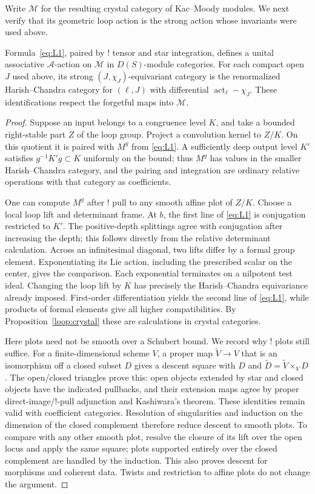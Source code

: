 Write $\mathcal M$ for the resulting crystal category of Kac--Moody
modules.  We next verify that its geometric loop action is the strong
action whose invariants were used above.

\begin{proposition}\label{loop:strong-action}
Formula~\eqref{eq:L1}, paired by ! tensor and star integration, defines
a unital associative $\mathcal A$-action on $\mathcal M$ in
$D(S)$-module categories.  For each compact open $J$ used above, its
strong $(J,\chi_J)$-equivariant category is the renormalized
Harish--Chandra category for $(\ell,J)$ with differential
$\operatorname{act}_\ell-\chi_J$.  These identifications respect
the forgetful maps into $\mathcal M$.
\end{proposition}

\begin{proof}
Suppose an input belongs to a congruence level $K$, and take a bounded
right-stable part $Z$ of the loop group.  Project a convolution kernel
to $Z/K$.  On this quotient it is paired with $M^g$ from
\eqref{eq:L1}.  A sufficiently deep output level $K'$ satisfies
$g^{-1}K'g\subset K$ uniformly on the bound; thus $M^g$ has values in
the smaller Harish--Chandra category, and the pairing and integration
are ordinary relative operations with that category as coefficients.

One can compute $M^g$ after ! pull to any smooth affine plot of $Z/K$.
Choose a local loop lift and determinant frame.  At $b$, the first
line of \eqref{eq:L1} is conjugation restricted to $K'$.  The
positive-depth splittings agree with conjugation after increasing
the depth; this follows directly from the relative determinant
calculation.  Across an infinitesimal diagonal, two lifts differ by
a formal group element.  Exponentiating its Lie action, including
the prescribed scalar on the center, gives the comparison.  Each
exponential terminates on a nilpotent test ideal.  Changing the loop
lift by $K$ has precisely the Harish--Chandra equivariance already
imposed.  First-order differentiation yields the second line of
\eqref{eq:L1}, while products of formal elements give all higher
compatibilities.  By Proposition~\ref{loop:crystal} these are
calculations in crystal categories.

Here plots need not be smooth over a Schubert bound.  We record why
! plots still suffice.  For a finite-dimensional scheme $V$, a proper
map $\widetilde V\to V$ that is an isomorphism off a closed subset
$D$ gives a descent square with $D$ and
$\widetilde D=\widetilde V\times_VD$.  The open/closed triangles
prove this: open objects extended by star and closed objects have
the indicated pullbacks, and their extension maps agree by proper
direct-image/!-pull adjunction and Kashiwara's theorem.  These
identities remain valid with coefficient categories.  Resolution
of singularities and induction on the dimension of the closed
complement therefore reduce descent to smooth plots.  To compare
with any other smooth plot, resolve the closure of its lift over
the open locus and apply the same square; plots supported entirely
over the closed complement are handled by the induction.  This
also proves descent for morphisms and coherent data.  Twists and
restriction to affine plots do not change the argument.


\end{proof}
